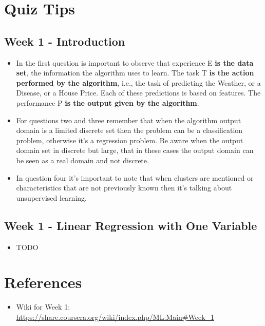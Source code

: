 \documentclass[a4paper]{article}
\begin{document}
\section{Quiz Tips}

\subsection{Week 1 - Introduction}

\begin{itemize}
\item In the first question is important to observe that experience E \textbf{is the data set}, the information the algorithm uses to learn. The task T \textbf{is the action performed by the algorithm}, i.e., the task of predicting the Weather, or a Disease, or a House Price. Each of these predictions is based on features. The performance P \textbf{is the output given by the algorithm}.
\item For questions two and three remember that when the algorithm output domain is a limited discrete set then the problem can be a classification problem, otherwise it's a regression problem. Be aware when the output domain set in discrete but large, that in these cases the output domain can be seen as a real domain and not discrete.
\item In question four it's important to note that when clusters are mentioned or characteristics that are not previously known then it's talking about unsupervised learning.
\end{itemize}

\subsection{Week 1 - Linear Regression with One Variable}

\begin{itemize}
\item TODO
\end{itemize}

\section{References}

\begin{itemize}
\item Wiki for Week 1: \url{
https://share.coursera.org/wiki/index.php/ML:Main\#Week\_1}
\end{itemize}
\end{document}
